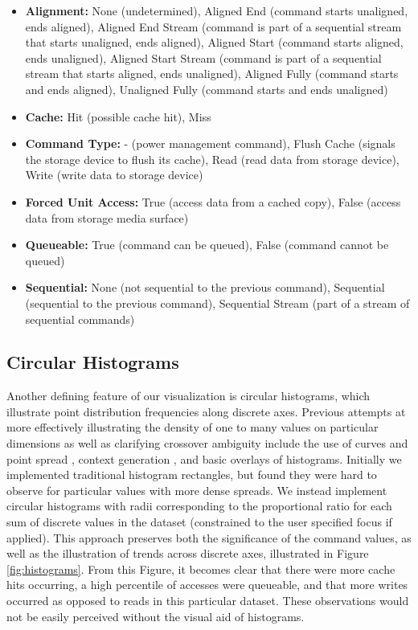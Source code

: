 \documentclass[journal]{vgtc}                %
\begin{document}
\noindent
\begin{itemize}
\item \textbf{Alignment:} None (undetermined), Aligned End (command starts unaligned, ends aligned), Aligned End Stream (command is part of a sequential stream that starts unaligned, ends aligned), Aligned Start (command starts aligned, ends unaligned), Aligned Start Stream (command is part of a sequential stream that starts aligned, ends unaligned), Aligned Fully (command starts and ends aligned), Unaligned Fully (command starts and ends unaligned)
\item \textbf{Cache:} Hit (possible cache hit), Miss
\item \textbf{Command Type:} - (power management command), Flush Cache (signals the storage device to flush its cache), Read (read data from storage device), Write (write data to storage device)
\item \textbf{Forced Unit Access:} True (access data from a cached copy), False (access data from storage media surface)
\item \textbf{Queueable:} True (command can be queued), False (command cannot be queued)
\item \textbf{Sequential:} None (not sequential to the previous command), Sequential (sequential to the previous command), Sequential Stream (part of a stream of sequential commands)
\end{itemize}

\subsection{Circular Histograms}

Another defining feature of our visualization is circular histograms, which illustrate point distribution frequencies along discrete axes. Previous attempts at more effectively illustrating the density of one to many values on particular dimensions as well as clarifying crossover ambiguity include the use of curves and point spread \cite{Graham:2003:UCE}, context generation \cite{novotny:2006:OPFC}, and basic overlays of histograms. Initially we implemented traditional histogram rectangles, but found they were hard to observe for particular values with more dense spreads. We instead implement circular histograms with radii corresponding to the proportional ratio for each sum of discrete values in the dataset (constrained to the user specified focus if applied). This approach preserves both the significance of the command values, as well as the illustration of trends across discrete axes, illustrated in Figure \ref{fig:histograms}. From this Figure, it becomes clear that there were more cache hits occurring, a high percentile of accesses were queueable, and that more writes occurred as opposed to reads in this particular dataset. These observations would not be easily perceived without the visual aid of histograms.
\end{document}
